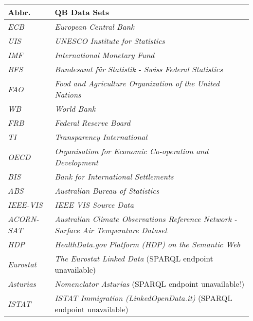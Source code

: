 \documentclass{llncs}
\begin{document}
\begin{table}[H]
	\centering
		\begin{tabular}{l|l}
      \textbf{Abbr.} & \textbf{QB Data Sets} \\		
      \hline
    \emph{ECB} & \emph{European Central Bank}\tablefootnote{\url{http://www.ecb.europa.eu/home/html/index.en.html}} \\
		\emph{UIS} & \emph{UNESCO Institute for Statistics}\tablefootnote{\url{http://www.uis.unesco.org/Pages/default.aspx}} \\
		\emph{IMF} & \emph{International Monetary Fund}\tablefootnote{\url{http://www.imf.org/external/index.htm}} \\
		\emph{BFS} & \emph{Bundesamt für Statistik - Swiss Federal Statistics}\tablefootnote{\url{http://www.bfs.admin.ch/}} \\
		\emph{FAO} & \emph{Food and Agriculture Organization of the United Nations}\tablefootnote{\url{http://www.fao.org/home/en/}} \\
		\emph{WB} & \emph{World Bank}\tablefootnote{\url{http://www.worldbank.org/}} \\
		\emph{FRB} & \emph{Federal Reserve Board}\tablefootnote{\url{http://www.federalreserve.gov/}} \\
		\emph{TI} & \emph{Transparency International}\tablefootnote{\url{http://www.transparency.org/}} \\
		\emph{OECD} & \emph{Organisation for Economic Co-operation and Development}\tablefootnote{\url{http://www.oecd.org/}} \\
		\emph{BIS} & \emph{Bank for International Settlements}\tablefootnote{\url{http://www.bis.org/}} \\
		\emph{ABS} & \emph{Australian Bureau of Statistics}\tablefootnote{\url{http://abs.gov.au/}} \\
		\emph{IEEE-VIS} & \emph{IEEE VIS Source Data} \\
		\emph{ACORN-SAT} & \emph{Australian Climate Observations Reference Network - Surface Air Temperature Dataset} \\
		\emph{HDP} & \emph{HealthData.gov Platform (HDP) on the Semantic Web} \\
		\emph{Eurostat} & \emph{The Eurostat Linked Data} (SPARQL endpoint unavailable) \\
		\emph{Asturias} & \emph{Nomenclator Asturias} (SPARQL endpoint unavailable!) \\
		\emph{ISTAT} & \emph{ISTAT Immigration (LinkedOpenData.it)} (SPARQL endpoint unavailable) \\

\end{tabular}
\end{table}
\end{document}
